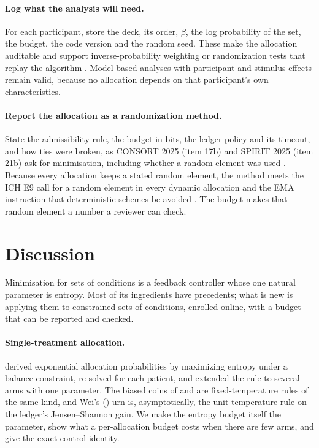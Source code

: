 \documentclass[11pt]{article}
\begin{document}
\paragraph{Log what the analysis will need.} For each participant, store the deck, its order, $\beta$, the log probability of the set, the budget, the code version and the random seed. These make the allocation auditable and support inverse-probability weighting \citep{horvitz1952} or randomization tests that replay the algorithm \citep{rosenberger2016}. Model-based analyses with participant and stimulus effects remain valid, because no allocation depends on that participant's own characteristics.

\paragraph{Report the allocation as a randomization method.} State the admissibility rule, the budget in bits, the ledger policy and its timeout, and how ties were broken, as CONSORT 2025 (item 17b) and SPIRIT 2025 (item 21b) ask for minimisation, including whether a random element was used \citep{hopewell2025,hrobjartsson2025}. Because every allocation keeps a stated random element, the method meets the ICH E9 call for a random element in every dynamic allocation \citep{ich1998} and the EMA instruction that deterministic schemes be avoided \citep{ema2015}. The budget makes that random element a number a reviewer can check.

\section{Discussion}\label{sec:discussion}

Minimisation for sets of conditions is a feedback controller whose one natural parameter is entropy. Most of its ingredients have precedents; what is new is applying them to constrained sets of conditions, enrolled online, with a budget that can be reported and checked.

\paragraph{Single-treatment allocation.} \citet{klotz1978} derived exponential allocation probabilities by maximizing entropy under a balance constraint, re-solved for each patient, and \citet{ryeznik2018} extended the rule to several arms with one parameter. The biased coins of \citet{smith1984} and \citet{ball1993} are fixed-temperature rules of the same kind, and Wei's (\citeyear{wei1977}) urn is, asymptotically, the unit-temperature rule on the ledger's Jensen--Shannon gain. We make the entropy budget itself the parameter, show what a per-allocation budget costs when there are few arms, and give the exact control identity.
\end{document}
